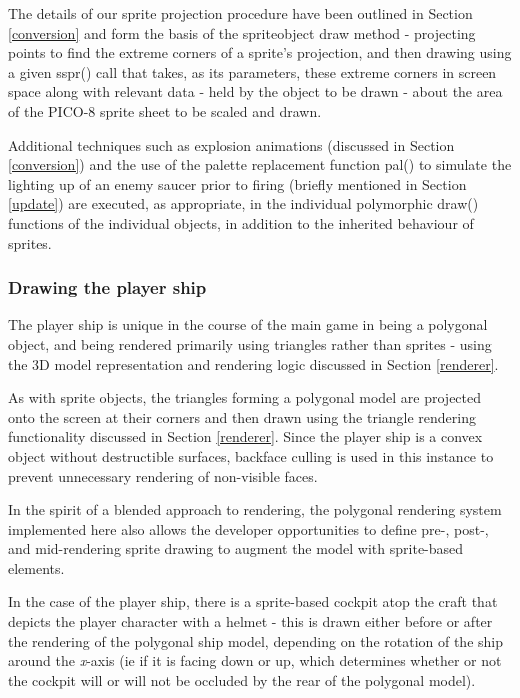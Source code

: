 \documentclass[11pt]{article}
\begin{document}
The details of our sprite projection procedure have been outlined in Section \ref{conversion} and
form the basis of the sprite\textunderscore object draw method - projecting points to find the
extreme corners of a sprite's projection, and then drawing using a given sspr() call that takes,
as its parameters, these extreme corners in screen space along with relevant data - held by the object to
be drawn - about the area of the PICO-8 sprite sheet to be scaled and drawn.

Additional techniques such as explosion animations (discussed in Section \ref{conversion}) and the
use of the palette replacement function pal() to simulate the lighting up of an enemy saucer prior to
firing (briefly mentioned in Section \ref{update}) are executed, as appropriate, in the individual
polymorphic draw()  functions of the individual objects, in addition to the inherited behaviour of sprites.


\subsubsection*{Drawing the player ship}

The player ship is unique in the course of the main game in being a polygonal object, and being
rendered primarily using triangles rather than sprites - using the 3D model representation and
rendering logic discussed in Section \ref{renderer}.

As with sprite objects, the triangles forming a polygonal model are projected onto the screen at their
corners and then drawn using the triangle rendering functionality discussed in Section \ref{renderer}. Since
the player ship is a convex object without destructible surfaces, backface culling is used in this
instance to prevent unnecessary rendering of non-visible faces.

In the spirit of a blended approach to rendering, the polygonal rendering system implemented here 
also allows the developer opportunities to define pre-, post-, and mid-rendering sprite drawing to
augment the model with sprite-based elements.

In the case of the player ship, there is a sprite-based
cockpit atop the craft that depicts the player character with a helmet - this is drawn either before
or after the rendering of the polygonal ship model, depending on the rotation of the ship around the
\textit{x}-axis (ie if it is facing down or up, which determines whether or not the cockpit will or
will not be occluded by the rear of the polygonal model).
\end{document}
